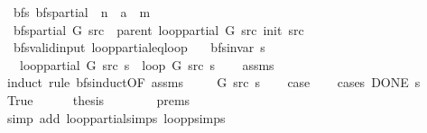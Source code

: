 \begin{isabellebody}
\isanewline
{}\isamarkupfalse%
\ {\isacharparenleft}{\kern0pt}\ bfs{\isacharparenright}{\kern0pt}\ bfs{\isacharunderscore}{\kern0pt}partial\ {\isacharcolon}{\kern0pt}{\isacharcolon}{\kern0pt}\ {\isachardoublequoteopen}{\isacharprime}{\kern0pt}n\ {\isasymRightarrow}\ {\isacharprime}{\kern0pt}a\ {\isasymRightarrow}\ {\isacharprime}{\kern0pt}m{\isachardoublequoteclose}\ \isanewline
\ \ {\isachardoublequoteopen}bfs{\isacharunderscore}{\kern0pt}partial\ G\ src\ {\isasymequiv}\ parent\ {\isacharparenleft}{\kern0pt}loop{\isacharunderscore}{\kern0pt}partial\ G\ src\ {\isacharparenleft}{\kern0pt}init\ src{\isacharparenright}{\kern0pt}{\isacharparenright}{\kern0pt}{\isachardoublequoteclose}\isanewline
\isanewline
{}\isamarkupfalse%
\ {\isacharparenleft}{\kern0pt}\ bfs{\isacharunderscore}{\kern0pt}valid{\isacharunderscore}{\kern0pt}input{\isacharparenright}{\kern0pt}\ loop{\isacharunderscore}{\kern0pt}partial{\isacharunderscore}{\kern0pt}eq{\isacharunderscore}{\kern0pt}loop{\isacharcolon}{\kern0pt}\isanewline
\ \ \ {\isachardoublequoteopen}bfs{\isacharunderscore}{\kern0pt}invar{\isacharprime}{\kern0pt}{\isacharprime}{\kern0pt}\ s{\isachardoublequoteclose}\isanewline
\ \ \ {\isachardoublequoteopen}loop{\isacharunderscore}{\kern0pt}partial\ G\ src\ s\ {\isacharequal}{\kern0pt}\ loop\ G\ src\ s{\isachardoublequoteclose}\isanewline
%
\isadelimproof
\ \ %
\endisadelimproof
%
\isatagproof
{}\isamarkupfalse%
\ assms\isanewline
{}\isamarkupfalse%
\ {\isacharparenleft}{\kern0pt}induct\ rule{\isacharcolon}{\kern0pt}\ bfs{\isacharunderscore}{\kern0pt}induct{\isacharbrackleft}{\kern0pt}OF\ assms{\isacharbrackright}{\kern0pt}{\isacharparenright}{\kern0pt}\isanewline
\ \ \isamarkupfalse%
\ {\isacharparenleft}{\kern0pt}{}\ G\ src\ s{\isacharparenright}{\kern0pt}\isanewline
\ \ \isamarkupfalse%
\ {\isacharquery}{\kern0pt}case\isanewline
\ \ \isamarkupfalse%
\ {\isacharparenleft}{\kern0pt}cases\ {\isachardoublequoteopen}DONE\ s{\isachardoublequoteclose}{\isacharparenright}{\kern0pt}\isanewline
\ \ \ \ \isamarkupfalse%
\ True\isanewline
\ \ \ \ \isamarkupfalse%
\ {\isacharquery}{\kern0pt}thesis\isanewline
\ \ \ \ \ \ \isamarkupfalse%
\ {\isachardoublequoteopen}{}{\isachardot}{\kern0pt}prems{\isachardoublequoteclose}\isanewline
\ \ \ \ \ \ \isamarkupfalse%
\ {\isacharparenleft}{\kern0pt}simp\ add{\isacharcolon}{\kern0pt}\ loop{\isacharunderscore}{\kern0pt}partial{\isachardot}{\kern0pt}simps\ loop{\isacharunderscore}{\kern0pt}psimps{\isacharparenright}{\kern0pt}\isanewline

\end{isabellebody}

